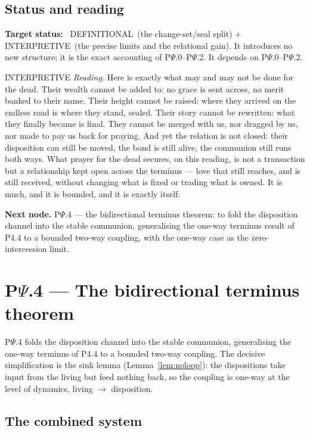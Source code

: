 \documentclass[11pt,a4paper]{article}
\newcommand{\stDef}{\textcolor{cDef}{\textsf{\small DEFINITIONAL}}}
\newcommand{\stInterp}{\textcolor{cInt}{\textsf{\small INTERPRETIVE}}}
\theoremstyle{definition}
\theoremstyle{plain}
\theoremstyle{remark}
\begin{document}
\subsection{Status and reading}

\textbf{Target status:}~
\stDef\ (the change-set/seal split) \(+\) \stInterp\ (the precise limits and the relational
gain). It introduces no new structure; it is the exact accounting of P$\Psi$.0--P$\Psi$.2. It
depends on P$\Psi$.0--P$\Psi$.2.

\medskip
\stInterp\quad
\emph{Reading.}
Here is exactly what may and may not be done for the dead. Their wealth cannot be added to:
no grace is sent across, no merit banked to their name. Their height cannot be raised: where
they arrived on the endless road is where they stand, sealed. Their story cannot be rewritten:
what they finally became is final. They cannot be merged with us, nor dragged by us, nor made
to pay us back for praying. And yet the relation is not closed: their disposition can still be
moved, the bond is still alive, the communion still runs both ways. What prayer for the dead
secures, on this reading, is not a transaction but a relationship kept open across the
terminus --- love that still reaches, and is still received, without changing what is fixed or
trading what is owned. It is much, and it is bounded, and it is exactly itself.

\medskip
\textbf{Next node.} P$\Psi$.4 --- the bidirectional terminus theorem: to fold the disposition
channel into the stable communion, generalising the one-way terminus result of P4.4 to a
bounded two-way coupling, with the one-way case as the zero-intercession limit.

\section{P$\Psi$.4 --- The bidirectional terminus theorem}

P$\Psi$.4 folds the disposition channel into the stable communion, generalising the one-way
terminus of P4.4 to a bounded two-way coupling. The decisive simplification is the sink lemma
(Lemma~\ref{lem:noloop}): the dispositions take input from the living but feed nothing back, so
the coupling is one-way at the level of dynamics, living \(\to\) disposition.

\subsection{The combined system}
\end{document}
